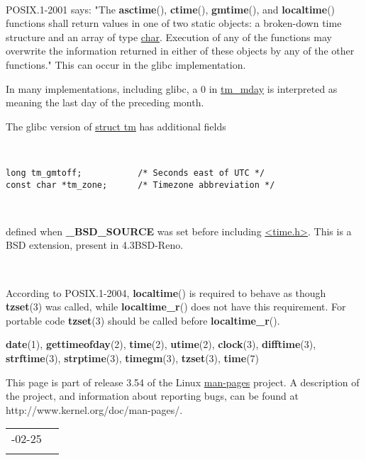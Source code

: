 \documentclass[]{article}
\let\realtextbf=\textbf
\renewcommand{\textbf}[1]{\textcolor{boldcolor}{\realtextbf{#1}}}
\renewcommand{\emph}[1]{\underline{#1}}
\begin{document}
~

POSIX.1-2001 says: "The \textbf{asctime}(), \textbf{ctime}(),
\textbf{gmtime}(), and \textbf{localtime}() functions shall return
values in one of two static objects: a broken-down time structure and an
array of type \emph{char}. Execution of any of the functions may
overwrite the information returned in either of these objects by any of
the other functions." This can occur in the glibc implementation.

In many implementations, including glibc, a 0 in \emph{tm\_mday} is
interpreted as meaning the last day of the preceding month.

The glibc version of \emph{struct tm} has additional fields

~

\begin{verbatim}
long tm_gmtoff;           /* Seconds east of UTC */
const char *tm_zone;      /* Timezone abbreviation */
\end{verbatim}

~

defined when \textbf{\_BSD\_SOURCE} was set before including
\emph{\textless{}time.h\textgreater{}}. This is a BSD extension, present
in 4.3BSD-Reno.

~

According to POSIX.1-2004, \textbf{localtime}() is required to behave as
though \textbf{tzset}(3) was called, while \textbf{localtime\_r}() does
not have this requirement. For portable code \textbf{tzset}(3) should be
called before \textbf{localtime\_r}().


\textbf{date}(1), \textbf{gettimeofday}(2), \textbf{time}(2),
\textbf{utime}(2), \textbf{clock}(3), \textbf{difftime}(3),
\textbf{strftime}(3), \textbf{strptime}(3), \textbf{timegm}(3),
\textbf{tzset}(3), \textbf{time}(7)


This page is part of release 3.54 of the Linux \emph{man-pages} project.
A description of the project, and information about reporting bugs, can
be found at http://www.kernel.org/doc/man-pages/.

\begin{longtable}[c]{@{}ll@{}}
\toprule\addlinespace
2010-02-25 &
\\\addlinespace
\bottomrule
\end{longtable}
\end{document}
